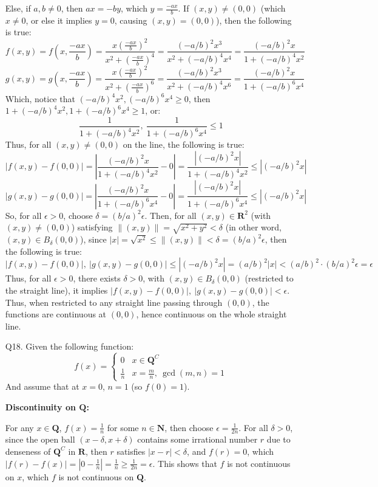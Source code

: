 \documentclass{article}
\begin{document}
\begin{itemize}
    Else, if $a,b\neq 0$, then $ax=-by$, which $y=\frac{-ax}{b}$. If $(x,y)\neq(0,0)$ (which $x\neq 0$, or else it implies $y=0$, causing $(x,y)=(0,0)$), then the following is true:
    $$f(x,y) = f(x,\frac{-ax}{b})=\frac{x(\frac{-ax}{b})^2}{x^2+(\frac{-ax}{b})^4} = \frac{(-a/b)^2x^3}{x^2+(-a/b)^4x^4}=\frac{(-a/b)^2x}{1+(-a/b)^4x^2}$$
    $$g(x,y) = g(x,\frac{-ax}{b})=\frac{x(\frac{-ax}{b})^2}{x^2+(\frac{-ax}{b})^6} = \frac{(-a/b)^2x^3}{x^2+(-a/b)^4x^6}=\frac{(-a/b)^2x}{1+(-a/b)^6x^4}$$
    Which, notice that $(-a/b)^4x^2, (-a/b)^6x^4 \geq 0$, then $1+(-a/b)^4x^2, 1+(-a/b)^6x^4 \geq 1$, or:
    $$\frac{1}{1+(-a/b)^4x^2},\ \frac{1}{1+(-a/b)^6x^4} \leq 1$$
    Thus, for all $(x,y)\neq(0,0)$ on the line, the following is true:
    $$|f(x,y)-f(0,0)| = \left|\frac{(-a/b)^2x}{1+(-a/b)^4x^2}-0\right| = \frac{|(-a/b)^2x|}{1+(-a/b)^4x^2} \leq |(-a/b)^2x|$$
    $$|g(x,y)-g(0,0)| = \left|\frac{(-a/b)^2x}{1+(-a/b)^6x^4}-0\right| = \frac{|(-a/b)^2x|}{1+(-a/b)^6x^4} \leq |(-a/b)^2x|$$
    So, for all $\epsilon>0$, choose $\delta = (b/a)^2\epsilon$. Then, for all $(x,y)\in\mathbf{R}^2$ (with $(x,y)\neq (0,0)$) satisfying $\|(x,y)\| = \sqrt{x^2+y^2}< \delta$ (in other word, $(x,y)\in B_\delta(0,0)$), since $|x| = \sqrt{x^2} \leq \|(x,y)\| < \delta = (b/a)^2\epsilon$, then the following is true:
    $$|f(x,y)-f(0,0)|,\ |g(x,y)-g(0,0)| \leq |(-a/b)^2x| = (a/b)^2|x| < (a/b)^2 \cdot (b/a)^2\epsilon = \epsilon$$
    Thus, for all $\epsilon>0$, there exists $\delta>0$, with $(x,y) \in B_\delta(0,0)$ (restricted to the straight line), it implies $|f(x,y)-f(0,0)|,\ |g(x,y)-g(0,0)| < \epsilon$. Thus, when restricted to any straight line passing through $(0,0)$, the functions are continuous at $(0,0)$, hence continuous on the whole straight line.

    \break

    \item[Q18.]Given the following function:
    $$f(x)=\begin{cases}
                0 & x\in\mathbf{Q}^C\\
                \frac{1}{n} & x=\frac{m}{n},\ \gcd(m,n)=1
            \end{cases}$$
    And assume that at $x=0$, $n=1$ (so $f(0)=1$).

    \textbf{Discontinuity on $\mathbf{Q}$:}
    
    For any $x\in \mathbf{Q}$, $f(x)=\frac{1}{n}$ for some $n\in\mathbf{N}$, then choose $\epsilon = \frac{1}{2n}$. For all $\delta >0$, since the open ball $(x-\delta, x+\delta)$ contains some irrational number $r$ due to denseness of $\mathbf{Q}^C$ in $\mathbf{R}$, then $r$ satisfies $|x-r| < \delta$, and $f(r) = 0$, which $|f(r)-f(x)| = |0-\frac{1}{n}| = \frac{1}{n} \geq \frac{1}{2n} = \epsilon$. This shows that $f$ is not continuous on $x$, which $f$ is not continuous on $\mathbf{Q}$.


\end{itemize}
\end{document}
